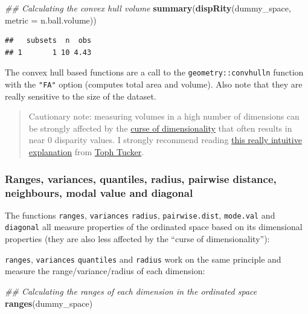 \documentclass[]{book}
\newenvironment{Shaded}{\begin{snugshade}}{\end{snugshade}}
\newcommand{\CommentTok}[1]{\textcolor[rgb]{0.56,0.35,0.01}{\textit{#1}}}
\newcommand{\DataTypeTok}[1]{\textcolor[rgb]{0.13,0.29,0.53}{#1}}
\newcommand{\KeywordTok}[1]{\textcolor[rgb]{0.13,0.29,0.53}{\textbf{#1}}}
\newcommand{\NormalTok}[1]{#1}
\begin{document}
\begin{Shaded}
\begin{Highlighting}[]
\CommentTok{## Calculating the convex hull volume}
\KeywordTok{summary}\NormalTok{(}\KeywordTok{dispRity}\NormalTok{(dummy_space, }\DataTypeTok{metric =}\NormalTok{ n.ball.volume))}
\end{Highlighting}
\end{Shaded}

\begin{verbatim}
##   subsets  n  obs
## 1       1 10 4.43
\end{verbatim}

The convex hull based functions are a call to the \texttt{geometry::convhulln} function with the \texttt{"FA"} option (computes total area and volume).
Also note that they are really sensitive to the size of the dataset.

\begin{quote}
Cautionary note: measuring volumes in a high number of dimensions can be strongly affected by the \href{https://en.wikipedia.org/wiki/Curse_of_dimensionality}{curse of dimensionality} that often results in near 0 disparity values. I strongly recommend reading \href{https://beta.observablehq.com/@tophtucker/theres-plenty-of-room-in-the-corners}{this really intuitive explanation} from \href{https://github.com/tophtucker}{Toph Tucker}.
\end{quote}

\hypertarget{ranges-variances-quantiles-radius-pairwise-distance-neighbours-modal-value-and-diagonal}{%
\subsubsection{Ranges, variances, quantiles, radius, pairwise distance, neighbours, modal value and diagonal}\label{ranges-variances-quantiles-radius-pairwise-distance-neighbours-modal-value-and-diagonal}}

The functions \texttt{ranges}, \texttt{variances} \texttt{radius}, \texttt{pairwise.dist}, \texttt{mode.val} and \texttt{diagonal} all measure properties of the ordinated space based on its dimensional properties (they are also less affected by the ``curse of dimensionality''):

\texttt{ranges}, \texttt{variances} \texttt{quantiles} and \texttt{radius} work on the same principle and measure the range/variance/radius of each dimension:

\begin{Shaded}
\begin{Highlighting}[]
\CommentTok{## Calculating the ranges of each dimension in the ordinated space}
\KeywordTok{ranges}\NormalTok{(dummy_space)}
\end{Highlighting}
\end{Shaded}
\end{document}
